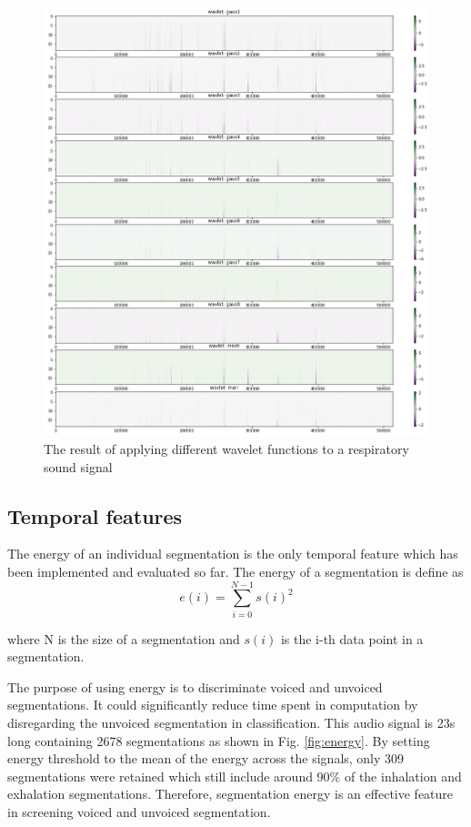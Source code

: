 \begin{figure}[h]
    \centerline{\includegraphics[scale=0.45]{figures/wavelet_trans_wav_func.png}}
    \caption{The result of applying different wavelet functions to a respiratory sound signal}
    \label{fig:wavelet_functions}
\end{figure}

\clearpage
\subsection{Temporal features}
The energy of an individual segmentation is the only temporal feature which has been implemented and evaluated so far. The energy of a segmentation is define as 
\begin{equation}
e(i) = \sum_{i=0}^{N-1}{s(i)^2}
\end{equation}

where N is the size of a segmentation and $s(i)$ is the i-th data point in a segmentation.

The purpose of using energy is to discriminate voiced and unvoiced segmentations. It could significantly reduce time spent in computation by disregarding the unvoiced segmentation in classification. This audio signal is 23s long containing 2678 segmentations as shown in Fig. \ref{fig:energy}. By setting energy threshold to the mean of the energy across the signals, only 309 segmentations were retained which still include around 90\% of the inhalation and exhalation segmentations. Therefore, segmentation energy is an effective feature in screening voiced and unvoiced segmentation. 

